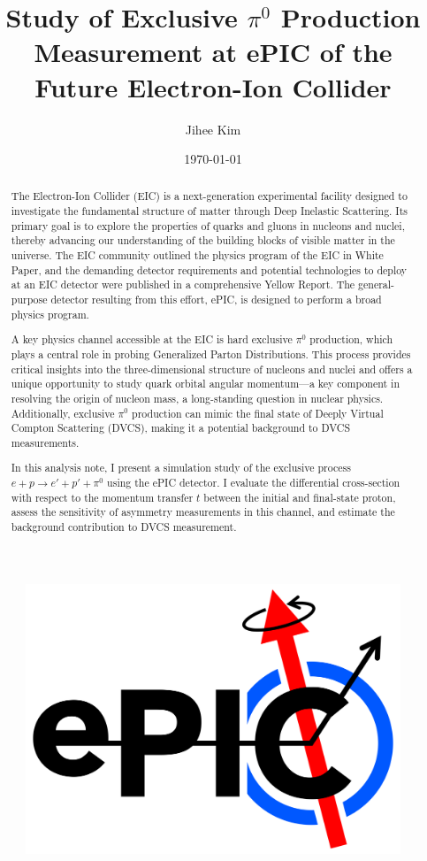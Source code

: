 \documentclass[letterpaper,12pt]{article}
\title{Study of Exclusive $\pi^{0}$ Production Measurement at ePIC of the Future Electron-Ion Collider}
\author[1]{Jihee Kim}
\affil[1]{Department of Physics, Brookhaven National Laboratory, Upton, NY 11973, U.S.A.}
\date{\today}
\begin{document}
\maketitle
\begin{abstract}
The Electron-Ion Collider (EIC) is a next-generation experimental facility designed to investigate the fundamental structure of matter through Deep Inelastic Scattering. Its primary goal is to explore the properties of quarks and gluons in nucleons and nuclei, thereby advancing our understanding of the building blocks of visible matter in the universe. The EIC community outlined the physics program of the EIC in White Paper, and the demanding detector requirements and potential technologies to deploy at an EIC detector were published in a comprehensive Yellow Report. The general-purpose detector resulting from this effort, ePIC,  is designed to perform a broad physics program. 

A key physics channel accessible at the EIC is hard exclusive $\pi^0$ production, which plays a central role in probing Generalized Parton Distributions. This process provides critical insights into the three-dimensional structure of nucleons and nuclei and offers a unique opportunity to study quark orbital angular momentum—a key component in resolving the origin of nucleon mass, a long-standing question in nuclear physics. Additionally, exclusive $\pi^0$ production can mimic the final state of Deeply Virtual Compton Scattering (DVCS), making it a potential background to DVCS measurements. 

In this analysis note, I present a simulation study of the exclusive process $e + p \rightarrow e' + p' + \pi^0$ using the ePIC detector. I evaluate the differential cross-section with respect to the momentum transfer $t$ between the initial and final-state proton, assess the sensitivity of asymmetry measurements in this channel, and estimate the background contribution to DVCS measurement.
\end{abstract}

\begin{figure}[h]
    \centering
    \includegraphics[scale=0.5]{Figures/EPIC-logo_black.png}
\end{figure}
\end{document}
